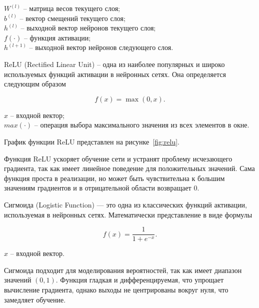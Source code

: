    ${W^{(l)}}$ – матрица весов текущего слоя;\\
\hphantom{где} ${b^{(l)}}$ – вектор смещений текущего слоя;\\
\hphantom{где} ${h^{(l)}}$ – выходной вектор нейронов текущего слоя;\\
\hphantom{где} $f(\cdot)$ – функция активации;\\
\hphantom{где} ${h^{(l+1)}}$ – выходной вектор нейронов следующего слоя.

\anonsection{}ReLU (Rectified Linear Unit) – одна из наиболее популярных и 
широко используемых функций активации в нейронных сетях. Она определяется 
следующим образом

\begin{equation}
    f(x) = \max(0, x).
\end{equation}

   ${x}$ – входной вектор;\\
\hphantom{где} $max(\cdot)$ – операция выбора максимального значения из всех элементов в окне.

График функции ReLU представлен на рисунке~\ref{fig:relu}.


Функция ReLU ускоряет обучение сети и устранят проблему исчезающего градиента, 
так как имеет линейное поведение для положительных значений. Сама функция 
проста в реализации, но может быть чувствительна к большим значениям градиентов
и в отрицательной области возвращает 0.

\anonsection{}Сигмоида (Logistic Function) — это одна из классических 
функций активации, используемая в нейронных сетях. Математически представление 
в виде формулы

\begin{equation}
    f(x) = \frac{1}{1 + e^{-x}}.
\end{equation}

 ${x}$ – входной вектор.

Сигмоида подходит для моделирования вероятностей, так как имеет диапазон 
значений $ (0,1) $. Функция гладкая и дифференцируемая, что упрощает вычисление
градиента, однако выходы не центрированы вокруг нуля, что замедляет обучение.

